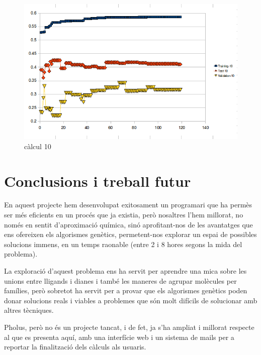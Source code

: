 \begin{figure}[h]
\begin{center}
\includegraphics[scale=0.75]{pholus/pholus10.png}
\end{center}
\caption{càlcul 10}
\label{fig:pholusResult10}
\end{figure}

\section{Conclusions i treball futur} %
\label{sec:PConclusions i treball futur}
En aquest projecte hem desenvolupat exitosament un programari que ha permès ser
més eficients en un procés que ja existia, però nosaltres l'hem millorat, no
només en sentit d'aproximació química, sinó aprofitant-nos de les avantatges que
ens ofereixen els algorismes genètics, permetent-nos explorar un espai de
possibles solucions immens, en un temps raonable (entre 2 i 8 hores segons la
mida del problema).

La exploració d'aquest problema ens ha servit per aprendre una mica sobre
les unions entre lligands i dianes i també les maneres de agrupar molècules per
famílies, però sobretot ha servit per a provar que els algorismes genètics poden
donar solucions reals i viables a problemes que són molt difícils de solucionar
amb altres tècniques.

Pholus, però no és un projecte tancat, i de fet, ja s'ha ampliat i millorat
respecte al que es presenta aquí, amb una interfície web i un sistema de mails
per a reportar la finalització dels càlculs als usuaris.

%
